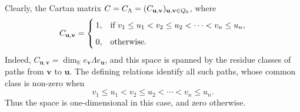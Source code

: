 \documentclass[11pt,a4paper]{amsart}
\theoremstyle{definition}
\numberwithin{equation}{section}
\newcommand{\0}{\mathbf{0}}
\begin{document}
	Clearly, the Cartan matrix $C=C_{\Lambda}=(C_{\bf u,v})_{{\bf u,v}\in Q_0}$, where 
	\begin{equation} \label{Cartan formula}
		C_{\bf u,v}
		=
		\begin{cases}
			1,
			&\text{if }v_1\le u_1<v_2\le u_2<\cdots<v_n\le u_n,\\[2mm]
			0,&\text{otherwise}.
		\end{cases}
	\end{equation}
	Indeed, $C_{\mathbf u,\mathbf v}
	=\dim_{\mathbb K}e_{\mathbf v}\Lambda e_{\mathbf u}$,
	and this space is spanned by the residue classes of paths from $\mathbf v$ to $\mathbf u$.
	The defining relations identify all such paths, whose common
	class is non-zero when
	$$v_1\le u_1<v_2\le u_2<\cdots<v_n\le u_n.$$
	Thus the space is one-dimensional in this case, and zero otherwise.
	
\end{document}
